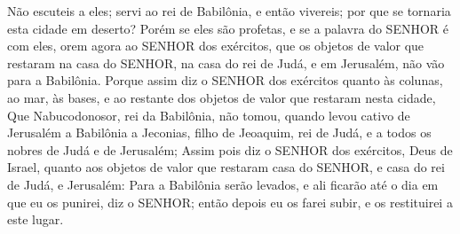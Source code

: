 {Não escuteis a eles; servi ao rei de Babilônia, e então vivereis; por que se tornaria esta cidade em deserto?
Porém se eles são profetas, e se a palavra do SENHOR é com eles, orem agora ao SENHOR dos exércitos, que os objetos de valor que restaram na casa do SENHOR, na casa do rei de Judá, e em Jerusalém, não vão para a Babilônia.
Porque assim diz o SENHOR dos exércitos quanto às colunas, ao mar, às bases, e ao restante dos objetos de valor que restaram nesta cidade,
Que Nabucodonosor, rei da Babilônia, não tomou, quando levou cativo de Jerusalém a Babilônia a Jeconias, filho de Jeoaquim, rei de Judá, e a todos os nobres de Judá e de Jerusalém;
Assim pois diz o SENHOR dos exércitos, Deus de Israel, quanto aos objetos de valor que restaram
{} casa do SENHOR, e
{} casa do rei de Judá, e
{} Jerusalém:
Para a Babilônia serão levados, e ali ficarão até o dia em que eu os punirei, diz o SENHOR; então depois eu os farei subir, e os restituirei a este lugar.

\par }

